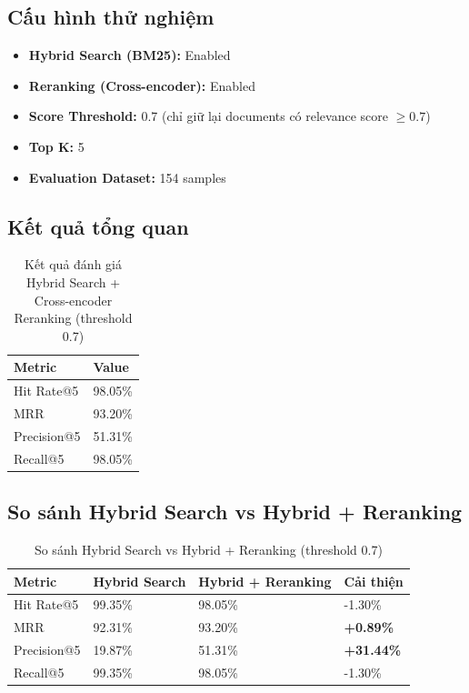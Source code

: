 \documentclass[../DoAn.tex]{subfiles}
\begin{document}
\subsection{Cấu hình thử nghiệm}
\begin{itemize}
    \item \textbf{Hybrid Search (BM25):} Enabled
    \item \textbf{Reranking (Cross-encoder):} Enabled
    \item \textbf{Score Threshold:} 0.7 (chỉ giữ lại documents có relevance score $\geq 0.7$)
    \item \textbf{Top K:} 5
    \item \textbf{Evaluation Dataset:} 154 samples
\end{itemize}

\subsection{Kết quả tổng quan}
\begin{table}[h]
\centering
\begin{tabular}{|l|l|}
\hline
\textbf{Metric} & \textbf{Value} \\
\hline
Hit Rate@5 & 98.05\% \\
\hline
MRR & 93.20\% \\
\hline
Precision@5 & 51.31\% \\
\hline
Recall@5 & 98.05\% \\
\hline
\end{tabular}
\caption{Kết quả đánh giá Hybrid Search + Cross-encoder Reranking (threshold 0.7)}
\label{tab:hybrid-rerank-results}
\end{table}

\subsection{So sánh Hybrid Search vs Hybrid + Reranking}
\begin{table}[h]
\centering
\begin{tabular}{|l|l|l|l|}
\hline
\textbf{Metric} & \textbf{Hybrid Search} & \textbf{Hybrid + Reranking} & \textbf{Cải thiện} \\
\hline
Hit Rate@5 & 99.35\% & 98.05\% & -1.30\% \\
\hline
MRR & 92.31\% & 93.20\% & \textbf{+0.89\%} \\
\hline
Precision@5 & 19.87\% & 51.31\% & \textbf{+31.44\%} \\
\hline
Recall@5 & 99.35\% & 98.05\% & -1.30\% \\
\hline
\end{tabular}
\caption{So sánh Hybrid Search vs Hybrid + Reranking (threshold 0.7)}
\label{tab:hybrid-vs-rerank}
\end{table}
\end{document}
